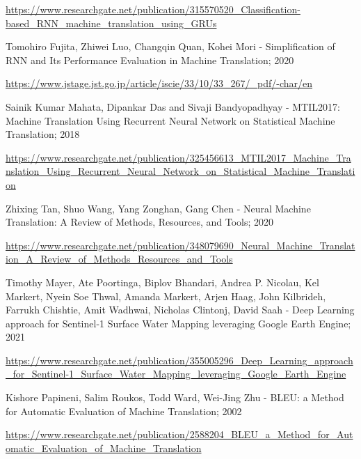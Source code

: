 \begin{thebibliography}{}
		\url{https://www.researchgate.net/publication/315570520_Classification-based_RNN_machine_translation_using_GRUs}
		
		 Tomohiro Fujita, Zhiwei Luo, Changqin Quan, Kohei Mori - Simplification of RNN and Its Performance Evaluation in Machine Translation; 2020
		
		\url{https://www.jstage.jst.go.jp/article/iscie/33/10/33_267/_pdf/-char/en}
		
		 Sainik Kumar Mahata, Dipankar Das and Sivaji Bandyopadhyay -  MTIL2017: Machine Translation Using Recurrent Neural Network on Statistical Machine Translation; 2018
		
		\url{https://www.researchgate.net/publication/325456613_MTIL2017_Machine_Translation_Using_Recurrent_Neural_Network_on_Statistical_Machine_Translation}
		
		 Zhixing Tan, Shuo Wang, Yang Zonghan, Gang Chen - Neural Machine Translation: A Review of Methods, Resources, and Tools; 2020
		
		\url{https://www.researchgate.net/publication/348079690_Neural_Machine_Translation_A_Review_of_Methods_Resources_and_Tools}
		
		 Timothy Mayer, Ate Poortinga, Biplov Bhandari, Andrea P. Nicolau, Kel Markert, Nyein Soe Thwal, Amanda Markert, Arjen Haag, John Kilbrideh, Farrukh Chishtie, Amit Wadhwai, Nicholas Clintonj, David Saah - Deep Learning approach for Sentinel-1 Surface Water Mapping leveraging Google Earth Engine; 2021
		
		\url{https://www.researchgate.net/publication/355005296_Deep_Learning_approach_for_Sentinel-1_Surface_Water_Mapping_leveraging_Google_Earth_Engine}
		
		 Kishore Papineni, Salim Roukos, Todd Ward, Wei-Jing Zhu - BLEU: a Method for Automatic Evaluation of Machine Translation; 2002
		
		\url{https://www.researchgate.net/publication/2588204_BLEU_a_Method_for_Automatic_Evaluation_of_Machine_Translation}
	\end{thebibliography}




